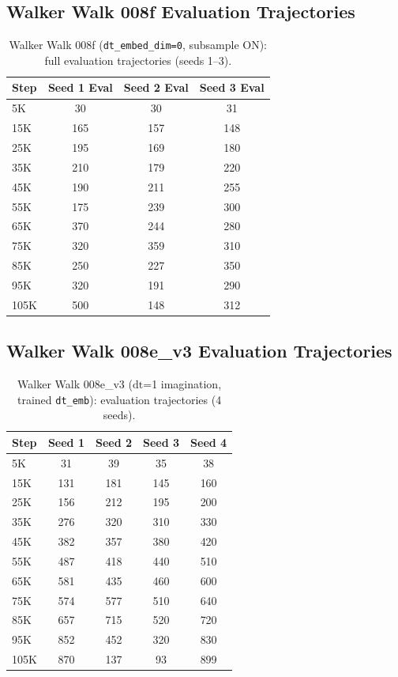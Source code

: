 \documentclass{article}
\newcommand{\dt}{\mathrm{dt}}
\begin{document}
\subsection{Walker Walk 008f Evaluation Trajectories}

\begin{table}[h]
\centering
\caption{Walker Walk 008f (\texttt{dt\_embed\_dim=0}, subsample ON): full evaluation trajectories (seeds 1--3).}
\label{tab:appendix-008f-traj}
\begin{tabular}{lccc}
\toprule
\textbf{Step} & \textbf{Seed 1 Eval} & \textbf{Seed 2 Eval} & \textbf{Seed 3 Eval} \\
\midrule
5K & 30 & 30 & 31 \\
15K & 165 & 157 & 148 \\
25K & 195 & 169 & 180 \\
35K & 210 & 179 & 220 \\
45K & 190 & 211 & 255 \\
55K & 175 & 239 & 300 \\
65K & 370 & 244 & 280 \\
75K & 320 & 359 & 310 \\
85K & 250 & 227 & 350 \\
95K & 320 & 191 & 290 \\
105K & 500 & 148 & 312 \\
\bottomrule
\end{tabular}
\end{table}

\subsection{Walker Walk 008e\_v3 Evaluation Trajectories}

\begin{table}[h]
\centering
\caption{Walker Walk 008e\_v3 ($\dt$=1 imagination, trained \texttt{dt\_emb}): evaluation trajectories (4 seeds).}
\label{tab:appendix-008ev3-traj}
\begin{tabular}{lcccc}
\toprule
\textbf{Step} & \textbf{Seed 1} & \textbf{Seed 2} & \textbf{Seed 3} & \textbf{Seed 4} \\
\midrule
5K & 31 & 39 & 35 & 38 \\
15K & 131 & 181 & 145 & 160 \\
25K & 156 & 212 & 195 & 200 \\
35K & 276 & 320 & 310 & 330 \\
45K & 382 & 357 & 380 & 420 \\
55K & 487 & 418 & 440 & 510 \\
65K & 581 & 435 & 460 & 600 \\
75K & 574 & 577 & 510 & 640 \\
85K & 657 & 715 & 520 & 720 \\
95K & 852 & 452 & 320 & 830 \\
105K & 870 & 137 & 93 & 899 \\
\bottomrule
\end{tabular}
\end{table}
\end{document}

